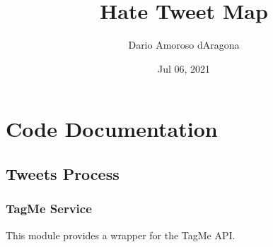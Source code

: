 \documentclass[letterpaper,10pt,english]{sphinxmanual}
\title{Hate Tweet Map}
\date{Jul 06, 2021}
\author{Dario Amoroso d\textquotesingle{}Aragona}
\begin{document}
\pagestyle{empty}
\sphinxmaketitle
\pagestyle{plain}
\sphinxtableofcontents
\pagestyle{normal}
\label{\detokenize{index::doc}}



\chapter{Code Documentation}
\label{\detokenize{code_comment/code_comment:code-documentation}}\label{\detokenize{code_comment/code_comment::doc}}

\section{Tweets Process}
\label{\detokenize{code_comment/tweet_processor:tweets-process}}\label{\detokenize{code_comment/tweet_processor::doc}}

\subsection{TagMe Service}
\label{\detokenize{code_comment/tweet_processor:module-hate_tweet_map.tweets_processor.MyTagMe}}\label{\detokenize{code_comment/tweet_processor:tagme-service}}
\sphinxAtStartPar
This module provides a wrapper for the TagMe API.
\end{document}
